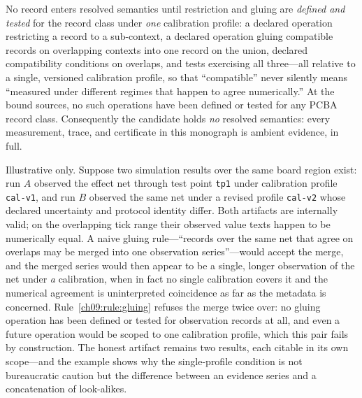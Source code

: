 \begin{ruleenv}\label{ch09:rule:gluing}
No record enters resolved semantics until restriction and gluing are \emph{defined and tested} for the record class under \emph{one} calibration profile: a declared operation restricting a record to a sub-context, a declared operation gluing compatible records on overlapping contexts into one record on the union, declared compatibility conditions on overlaps, and tests exercising all three---all relative to a single, versioned calibration profile, so that ``compatible'' never silently means ``measured under different regimes that happen to agree numerically.'' At the bound sources, no such operations have been defined or tested for any PCBA record class. Consequently the candidate holds \emph{no} resolved semantics: every measurement, trace, and certificate in this monograph is ambient evidence, in full.
\end{ruleenv}

\begin{example}\label{ch09:ex:gluing}
Illustrative only. Suppose two simulation results over the same board region exist: run $A$ observed the effect net through test point \texttt{tp1} under calibration profile \texttt{cal-v1}, and run $B$ observed the same net under a revised profile \texttt{cal-v2} whose declared uncertainty and protocol identity differ. Both artifacts are internally valid; on the overlapping tick range their observed value texts happen to be numerically equal. A naive gluing rule---``records over the same net that agree on overlaps may be merged into one observation series''---would accept the merge, and the merged series would then appear to be a single, longer observation of the net under \emph{a} calibration, when in fact no single calibration covers it and the numerical agreement is uninterpreted coincidence as far as the metadata is concerned. Rule~\ref{ch09:rule:gluing} refuses the merge twice over: no gluing operation has been defined or tested for observation records at all, and even a future operation would be scoped to one calibration profile, which this pair fails by construction. The honest artifact remains two results, each citable in its own scope---and the example shows why the single-profile condition is not bureaucratic caution but the difference between an evidence series and a concatenation of look-alikes.
\end{example}

